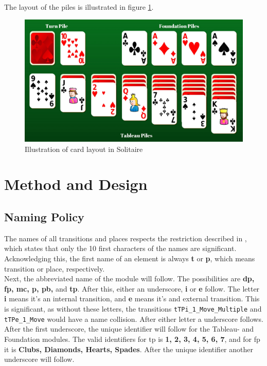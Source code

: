 \documentclass[runningheads,a4paper]{llncs}
\begin{document}
The layout of the piles is illustrated in figure \ref{fig:illuatration_solitaire}.
\begin{figure}
	\includegraphics[trim=150 0 0 0, scale=0.3]{images/TableauPiles}
	\caption{Illustration of card layout in Solitaire}
	\label{fig:illuatration_solitaire}
\end{figure}

\clearpage
\section{Method and Design}
\label{sec:2_method_and_design}
\subsection{Naming Policy}
\label{sec:2_naming_policy}
The names of all transitions and places respects the restriction described in \cite{GPenSIMguide}, which states that only the 10 first characters of the names are significant. Acknowledging this, the first name of an element is always \textbf{t} or \textbf{p}, which means transition or place, respectively. \\

Next, the abbreviated name of the module will follow. The possibilities are \textbf{\ac{dp}, \ac{fp}, \ac{mc}, \ac{p}, \ac{pb},} and \textbf{\ac{tp}}. After this, either an underscore, \textbf{i} or \textbf{e} follow. The letter \textbf{i} means it's an internal transition, and \textbf{e} means it's and external transition. This is significant, as without these letters, the transitions \verb!tTPi_1_Move_Multiple! and \verb!tTPe_1_Move! would have a name collision. After either letter a underscore follows.\\

After the first underscore, the unique identifier will follow for the Tableau- and Foundation modules. The valid identifiers for \ac{tp} is \textbf{1, 2, 3, 4, 5, 6, 7}, and for \ac{fp} it is \textbf{Clubs, Diamonds, Hearts, Spades}. After the unique identifier another underscore will follow.\\
\end{document}
